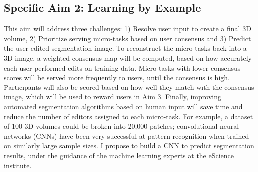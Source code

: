 
\subsection*{Specific Aim 2: Learning by Example}
This aim will address three challenges: 1) Resolve user input to create a final 3D volume, 2) Prioritize serving micro-tasks based on user consensus and 3) Predict the user-edited segmentation image. To reconstruct the micro-tasks back into a 3D image, a weighted consensus map will be computed, based on how accurately each user performed edits on training data. Micro-tasks with lower consensus scores will be served more frequently to users, until the consensus is high. Participants will also be scored based on how well they match with the consensus image, which will be used to reward users in Aim 3. Finally, improving automated segmentation algorithms based on human input will save time and reduce the number of editors assigned to each micro-task. For example, a dataset of 100 3D volumes could be broken into 20,000 patches; convolutional neural networks (CNNs) have been very successful at pattern recognition when trained on similarly large sample sizes. I propose to build a CNN to predict segmentation results, under the guidance of the machine learning experts at the eScience institute. 

